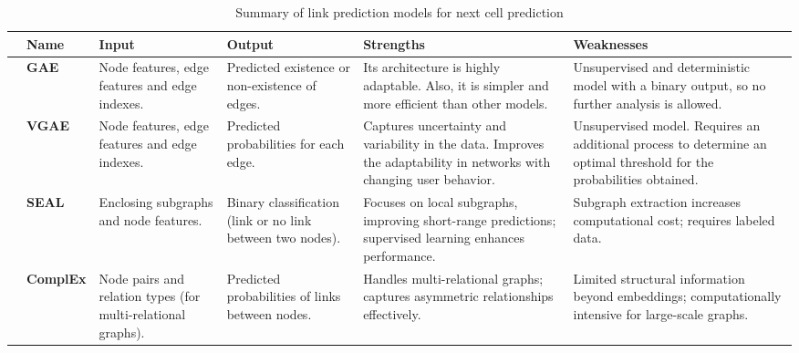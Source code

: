 \begin{table*}[ht!]
\centering
\renewcommand{\arraystretch}{1.5} %
\caption{Summary of link prediction models for next cell prediction}

\begin{tabular}{|p{0.2cm}|p{1cm}|p{2.35cm}|p{2.35cm}|p{4.75cm}|p{4.75cm}|}
\cline{1-6}

\textbf{} & \textbf{Name} & \textbf{Input} & \textbf{Output} & \textbf{Strengths} & \textbf{Weaknesses} \\ \hline

\multirow{2}{*}{\raisebox{-1\height}{\rotatebox{90}{\textbf{Autoencoders}}}}

& \textbf{GAE} & 
Node features, edge features and edge indexes. & 
Predicted existence or non-existence of edges. & 
Its architecture is highly adaptable. Also, it is simpler and more efficient than other models.  &  
Unsupervised and deterministic model with a binary output, so no further analysis is allowed. \\ \cline{2-6}

& \textbf{VGAE} & 
Node features, edge features and edge indexes. & 
Predicted probabilities for each edge. & 
Captures uncertainty and variability in the data. Improves the adaptability in networks with changing user behavior. & 
Unsupervised model. Requires an additional process to determine an optimal threshold for the probabilities obtained. \\ \cline{2-6}

\hline
\multirow{2}{*}{\raisebox{-0.95\height}{\rotatebox{90}{\textbf{Subgraph-based}}}}

& \textbf{SEAL} & 
Enclosing subgraphs and node features. & 
Binary classification (link or no link between two nodes). & 
Focuses on local subgraphs, improving short-range predictions; supervised learning enhances performance. & 
Subgraph extraction increases computational cost; requires labeled data. \\ \cline{2-6}

& \textbf{ComplEx} & 
Node pairs and relation types (for multi-relational graphs). & 
Predicted probabilities of links between nodes. & 
Handles multi-relational graphs; captures asymmetric relationships effectively. & 
Limited structural information beyond embeddings; computationally intensive for large-scale graphs. \\ \hline

\end{tabular}
\label{table:models}
\vspace*{-3ex}%
\end{table*}
